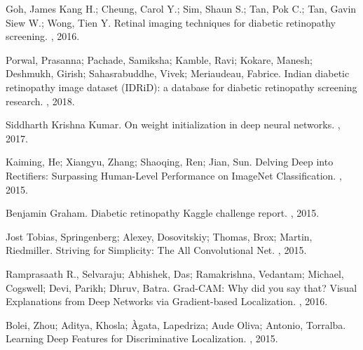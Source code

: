 \documentclass{article}
\begin{document}
  

\begin{thebibliography}{1}

  Goh, James Kang H.; Cheung, Carol Y.; Sim, Shaun S.; Tan, Pok C.; Tan, Gavin Siew W.; Wong, Tien Y.
  \newblock Retinal imaging techniques for diabetic retinopathy screening.
  , 2016.

  Porwal, Prasanna; Pachade, Samiksha; Kamble, Ravi; Kokare, Manesh; Deshmukh, Girish; Sahasrabuddhe, Vivek; Meriaudeau, Fabrice.
  \newblock Indian diabetic retinopathy image dataset (IDRiD): a database for diabetic retinopathy screening research.
  , 2018.

  Siddharth Krishna Kumar.
  \newblock On weight initialization in deep neural networks.
  , 2017.

  Kaiming, He; Xiangyu, Zhang; Shaoqing, Ren; Jian, Sun.
  \newblock Delving Deep into Rectifiers: Surpassing Human-Level Performance on ImageNet Classification.
  , 2015.

  Benjamin Graham.
  \newblock Diabetic retinopathy Kaggle challenge report.
  , 2015.

  Jost Tobias, Springenberg; Alexey, Dosovitskiy; Thomas, Brox; Martin, Riedmiller.
  \newblock Striving for Simplicity: The All Convolutional Net.
  , 2015.

  Ramprasaath R., Selvaraju; Abhishek, Das; Ramakrishna, Vedantam; Michael, Cogswell; Devi, Parikh; Dhruv, Batra.
  \newblock Grad-CAM: Why did you say that? Visual Explanations from Deep Networks via Gradient-based Localization.
  , 2016.

  Bolei, Zhou; Aditya, Khosla; {\`{A}}gata, Lapedriza; Aude Oliva; Antonio, Torralba.
  \newblock Learning Deep Features for Discriminative Localization.
  , 2015.
  \end{thebibliography}
\end{document}
